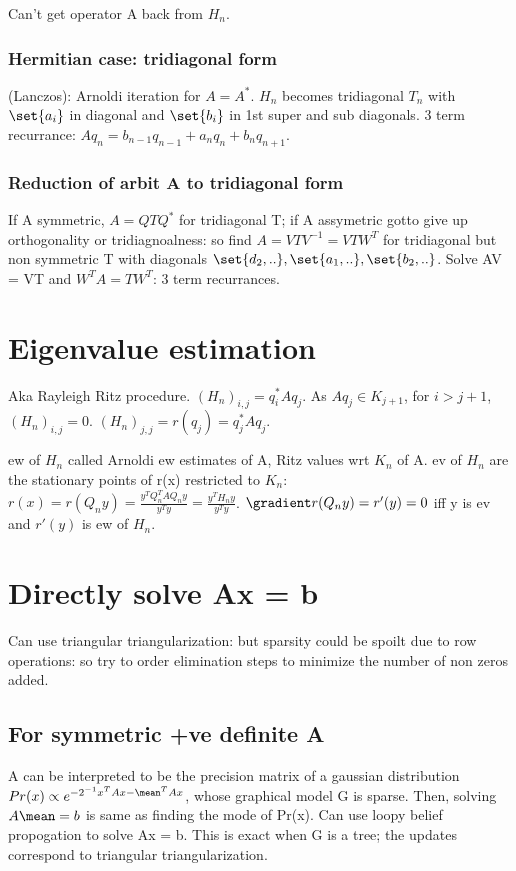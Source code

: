 \documentclass[oneside, article]{memoir}
\begin{document}
Can't get operator A back from $H_{n}$.

\subsection{Hermitian case: tridiagonal form}
(Lanczos): Arnoldi iteration for $A = A^{*}$. $H_{n}$ becomes tridiagonal $T_{n}$ with $\set{a_{i}}$ in diagonal and $\set{b_{i}}$ in 1st super and sub diagonals. 3 term recurrance: $Aq_{n} = b_{n-1}q_{n-1} + a_{n}q_{n}+ b_{n}q_{n+1}$.

\subsection{Reduction of arbit A to tridiagonal form}
If A symmetric, $A = QTQ^{*}$ for tridiagonal T; if A assymetric gotto give up orthogonality or tridiagnoalness: so find $A = VTV^{-1} = VTW^{T}$ for tridiagonal but non symmetric T with diagonals $\set{d_{2}, ..}, \set{a_{1}, ..}, \set{b_{2}, ..}$. Solve AV = VT and $W^{T}A = TW^{T}$: 3 term recurrances.

\chapter{Eigenvalue estimation}
Aka Rayleigh Ritz procedure. $(H_{n})_{i,j} = q_{i}^{*}Aq_{j}$. As $Aq_{j} \in K_{j+1}$, for $i>j+1$, $(H_{n})_{i,j} = 0$. $(H_{n})_{j,j} = r(q_{j}) = q_{j}^{*}Aq_{j}$.

ew of $H_{n}$ called Arnoldi ew estimates of A, Ritz values wrt $K_{n}$ of A.  ev of $H_{n}$ are the stationary points of r(x) restricted to $K_{n}$: $r(x) = r(Q_{n}y) = \frac{y^{T}Q_{n}^{T}AQ_{n}y}{y^{T}y} = \frac{y^{T}H_{n}y}{y^{T}y}$. $\gradient r(Q_{n}y) = r'(y) = 0$ iff y is ev and $r'(y)$ is ew of $H_{n}$.

\chapter{Directly solve Ax = b}
Can use triangular triangularization: but sparsity could be spoilt due to row operations: so try to order elimination steps to minimize the number of non zeros added.

\section{For symmetric +ve definite A}
A can be interpreted to be the precision matrix of a gaussian distribution $Pr(x) \propto e^{-2^{-1}x^{T}Ax - \mean^{T}Ax}$, whose graphical model G is sparse. Then, solving $A\mean = b$ is same as finding the mode of Pr(x). Can use loopy belief propogation to solve Ax = b. This is exact when G is a tree; the updates correspond to triangular triangularization.
\end{document}
